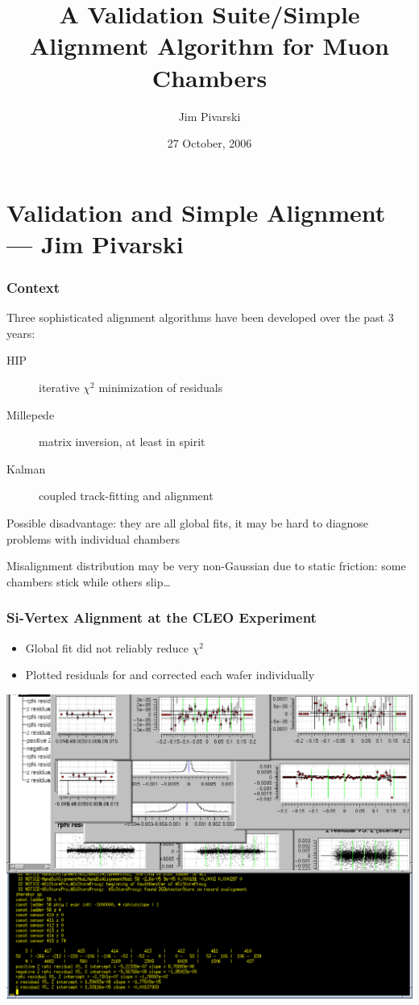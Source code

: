 \documentclass[12pt,compress]{beamer}
\title{A Validation Suite/Simple Alignment Algorithm for Muon Chambers}
\author{Jim Pivarski}
\institute{Texas A\&M University}
\date{27 October, 2006}
\begin{document}
\frame{\titlepage}
\section*{Validation and Simple Alignment --- Jim Pivarski}

\begin{frame}
\frametitle{Context}

Three sophisticated alignment algorithms have been developed over the past 3 years:

\begin{description}
\item[HIP] iterative $\chi^2$ minimization of residuals
\item[Millepede] matrix inversion, at least in spirit
\item[Kalman] coupled track-fitting and alignment
\end{description}

\vfill Possible disadvantage: they are all global fits, it may be hard
to diagnose problems with individual chambers

\vfill Misalignment distribution may be very non-Gaussian due to
static friction: some chambers stick while others slip\ldots
\end{frame}

\begin{frame}
\frametitle{Si-Vertex Alignment at the CLEO Experiment}
\begin{itemize}
\item Global fit did not reliably reduce $\chi^2$
\item Plotted residuals for and corrected each wafer individually
\end{itemize}
\begin{center}
\includegraphics[width=0.75\linewidth]{hand_alignment2}
\end{center}
\end{frame}
\end{document}
